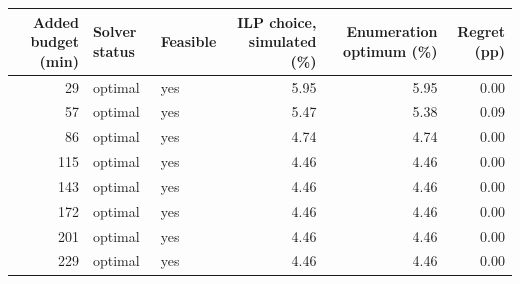 \begin{tabular}{rllrrr}
\hline
Added budget (min) & Solver status & Feasible & ILP choice, simulated (\%) & Enumeration optimum (\%) & Regret (pp) \\
\hline
29 & optimal & yes & 5.95 & 5.95 & 0.00 \\
57 & optimal & yes & 5.47 & 5.38 & 0.09 \\
86 & optimal & yes & 4.74 & 4.74 & 0.00 \\
115 & optimal & yes & 4.46 & 4.46 & 0.00 \\
143 & optimal & yes & 4.46 & 4.46 & 0.00 \\
172 & optimal & yes & 4.46 & 4.46 & 0.00 \\
201 & optimal & yes & 4.46 & 4.46 & 0.00 \\
229 & optimal & yes & 4.46 & 4.46 & 0.00 \\
\hline
\end{tabular}

